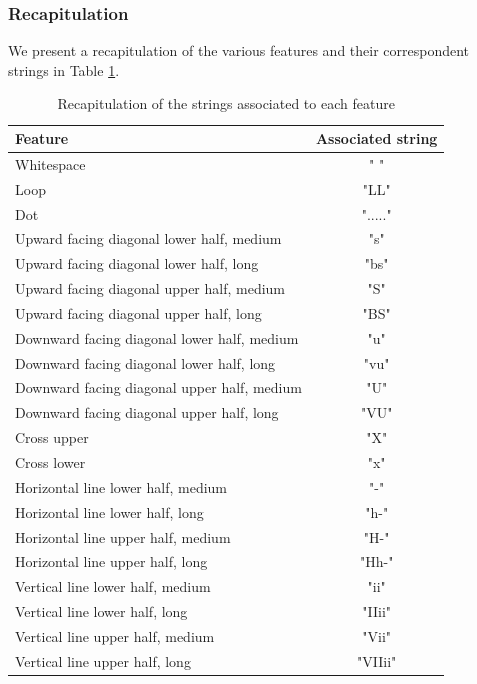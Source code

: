 \subsubsection*{Recapitulation}
We present a recapitulation of the various features and their correspondent strings in Table \ref{features}.
\begin{table}[!htbp]
\centering
\footnotesize
\begin{tabular}{|l | c |} 
 \hline  \multicolumn{1}{|p{2cm}|}{\bfseries Feature}
 & \multicolumn{1}{p{2cm}|}{\centering\bfseries Associated string} \\ [0.5ex] 
 \hline\hline
 Whitespace & " " \\ \hline
 Loop & "LL"\\\hline
 Dot & "....."\\ \hline
 Upward facing diagonal lower half, medium & "s" \\ \hline
 Upward facing diagonal lower half, long & "bs"  \\\hline
 Upward facing diagonal upper half, medium & "S" \\ \hline
 Upward facing diagonal upper half, long & "BS" \\\hline
 Downward facing diagonal lower half, medium& "u"\\ \hline
 Downward facing diagonal lower half, long &"vu" \\ \hline
 Downward facing diagonal upper half, medium& "U" \\\hline
 Downward facing diagonal upper half, long &"VU" \\\hline
 Cross upper & "X"\\\hline
 Cross lower & "x"\\\hline
 Horizontal line lower half, medium & "-"\\\hline
  Horizontal line lower half, long & "h-"\\\hline
   Horizontal line upper half, medium & "H-"\\\hline
    Horizontal line upper half, long & "Hh-"\\\hline
 Vertical line lower half, medium & "ii"\\\hline
  Vertical line lower half, long & "IIii"\\\hline
   Vertical line upper half, medium & "Vii"\\\hline
    Vertical line upper half, long & "VIIii"\\ 
 \hline
\end{tabular}
\caption{Recapitulation of the strings associated to each feature}
\label{features}
\end{table}



